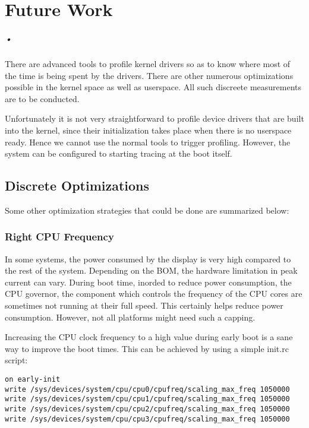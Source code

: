 

\chapter{Future Work}
\label{fut_work}
\paragraph*{•}

\hspace{8mm} 

\noindent There are advanced tools to profile kernel drivers so as to know
where most of the time is being spent by the drivers. There are other numerous
optimizations possible in the kernel space as well as userspace.
All such discreete measurements are to be conducted.

Unfortunately it is not very straightforward to profile device drivers that are built into the kernel,
since their initialization takes place when there is no userspace ready. Hence we cannot use the normal
tools to trigger profiling. However, the system can be configured to starting tracing at the boot itself.

\section{Discrete Optimizations}

Some other optimization strategies that could be done are summarized below:

\subsection{Right CPU Frequency}

In some systems, the power consumed by the display is very high compared to
the rest of the system. Depending on the BOM, the hardware limitation in peak
current can vary. During boot time, inorded to reduce power consumption,
the CPU governor, the component which controls the frequency of the CPU
cores are sometimes not running at their full speed. This certainly helps
reduce power consumption. However, not all platforms might need such a capping.

Increasing the CPU clock frequency to a high value during early boot is a sane
way to improve the boot times. This can be achieved by using a simple
init.rc script:
\begin{Verbatim}
on early-init
write /sys/devices/system/cpu/cpu0/cpufreq/scaling_max_freq 1050000
write /sys/devices/system/cpu/cpu1/cpufreq/scaling_max_freq 1050000
write /sys/devices/system/cpu/cpu2/cpufreq/scaling_max_freq 1050000
write /sys/devices/system/cpu/cpu3/cpufreq/scaling_max_freq 1050000
\end{Verbatim}

